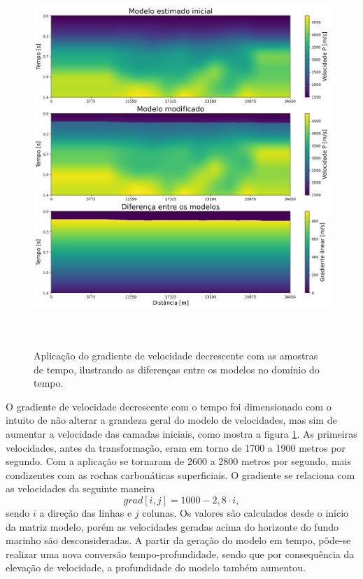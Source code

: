 \documentclass[
	12pt,				%
	openright,			%
	oneside,			%
	a4paper,			%
	english,			%
	brazil				%
	]{abntex2}
\begin{document}
	\begin{figure}[htp!]
		\centering
		\includegraphics[width=16cm,height=14.3cm]{../imagens/modificationTime.png}
		\caption{Aplicação do gradiente de velocidade decrescente com as amostras de tempo, ilustrando as diferenças entre os modelos no domínio do tempo.}
		\label{modificationTime}
	\end{figure}
	
	O gradiente de velocidade decrescente com o tempo foi dimensionado com o intuito de não alterar a grandeza geral do modelo de velocidades, mas sim de aumentar a velocidade das camadas iniciais, como mostra a figura \ref{modificationTime}. As primeiras velocidades, antes da transformação, eram em torno de 1700 a 1900 metros por segundo. Com a aplicação se tornaram de 2600 a 2800 metros por segundo, mais condizentes com as rochas carbonáticas superficiais. O gradiente se relaciona com as velocidades da seguinte maneira
%
	\begin{equation}
		grad[i,j] = 1000 - 2,8 \cdot i,
	\end{equation}
%
	\noindent sendo $i$ a direção das linhas e $j$ colunas. Os valores são calculados desde o início da matriz modelo, porém as velocidades geradas acima do horizonte do fundo marinho são desconsideradas. A partir da geração do modelo em tempo, pôde-se realizar uma nova conversão tempo-profundidade, sendo que por consequência da elevação de velocidade, a profundidade do modelo também aumentou. 
\end{document}
